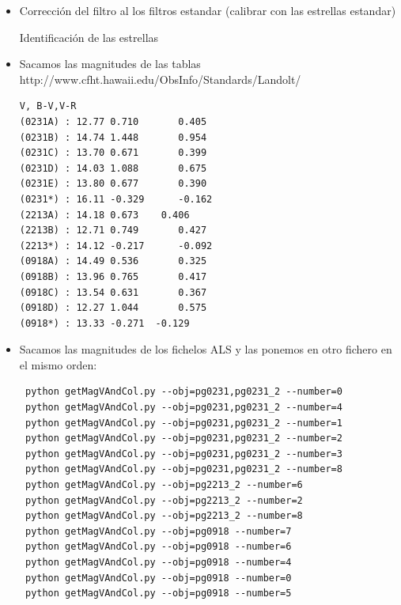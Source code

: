 \documentclass{article}
\begin{document}
\begin{itemize}

\item {Corrección del filtro} al los filtros estandar (calibrar con las estrellas estandar)

Identificación de las estrellas

\item Sacamos las magnitudes de las tablas
http://www.cfht.hawaii.edu/ObsInfo/Standards/Landolt/
\begin{verbatim}
V, B-V,V-R
(0231A) : 12.77	0.710		0.405	
(0231B) : 14.74	1.448		0.954	
(0231C) : 13.70	0.671		0.399
(0231D) : 14.03	1.088		0.675	
(0231E) : 13.80	0.677		0.390	
(0231*) : 16.11	-0.329		-0.162
(2213A) : 14.18	0.673	 0.406	
(2213B) : 12.71	0.749		0.427	
(2213*) : 14.12	-0.217		-0.092	
(0918A) : 14.49	0.536		0.325	
(0918B) : 13.96	0.765		0.417	
(0918C) : 13.54	0.631		0.367
(0918D) : 12.27	1.044		0.575	
(0918*) : 13.33	-0.271	-0.129	
\end{verbatim}

\item Sacamos las magnitudes  de los fichelos ALS
y las ponemos en otro fichero en el mismo orden:

\begin{verbatim}
 python getMagVAndCol.py --obj=pg0231,pg0231_2 --number=0
 python getMagVAndCol.py --obj=pg0231,pg0231_2 --number=4
 python getMagVAndCol.py --obj=pg0231,pg0231_2 --number=1
 python getMagVAndCol.py --obj=pg0231,pg0231_2 --number=2
 python getMagVAndCol.py --obj=pg0231,pg0231_2 --number=3
 python getMagVAndCol.py --obj=pg0231,pg0231_2 --number=8
 python getMagVAndCol.py --obj=pg2213_2 --number=6
 python getMagVAndCol.py --obj=pg2213_2 --number=2
 python getMagVAndCol.py --obj=pg2213_2 --number=8
 python getMagVAndCol.py --obj=pg0918 --number=7
 python getMagVAndCol.py --obj=pg0918 --number=6
 python getMagVAndCol.py --obj=pg0918 --number=4
 python getMagVAndCol.py --obj=pg0918 --number=0
 python getMagVAndCol.py --obj=pg0918 --number=5

\end{verbatim}



\end{itemize}
\end{document}
